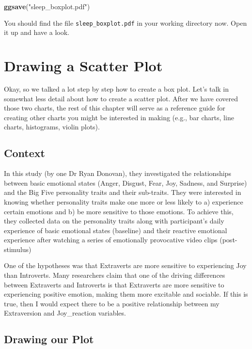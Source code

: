 \documentclass[
]{book}
\newenvironment{Shaded}{\begin{snugshade}}{\end{snugshade}}
\newcommand{\FunctionTok}[1]{\textcolor[rgb]{0.13,0.29,0.53}{\textbf{#1}}}
\newcommand{\NormalTok}[1]{#1}
\newcommand{\StringTok}[1]{\textcolor[rgb]{0.31,0.60,0.02}{#1}}
\begin{document}
\begin{Shaded}
\begin{Highlighting}[]
\FunctionTok{ggsave}\NormalTok{(}\StringTok{"sleep\_boxplot.pdf"}\NormalTok{)}
\end{Highlighting}
\end{Shaded}

You should find the file \texttt{sleep\_boxplot.pdf} in your working directory now. Open it up and have a look.

\section{Drawing a Scatter Plot}\label{drawing-a-scatter-plot}

Okay, so we talked a lot step by step how to create a box plot. Let's talk in somewhat less detail about how to create a scatter plot. After we have covered those two charts, the rest of this chapter will serve as a reference guide for creating other charts you might be interested in making (e.g., bar charts, line charts, histograms, violin plots).

\subsection{Context}\label{context}

In this study (by one Dr Ryan Donovan), they investigated the relationships between basic emotional states (Anger, Disgust, Fear, Joy, Sadness, and Surprise) and the Big Five personality traits and their sub-traits. They were interested in knowing whether personality traits make one more or less likely to a) experience certain emotions and b) be more sensitive to those emotions. To achieve this, they collected data on the personality traits along with participant's daily experience of basic emotional states (baseline) and their reactive emotional experience after watching a series of emotionally provocative video clips (post-stimulus)

One of the hypotheses was that Extraverts are more sensitive to experiencing Joy than Introverts. Many researchers claim that one of the driving differences between Extraverts and Introverts is that Extraverts are more sensitive to experiencing positive emotion, making them more excitable and sociable. If this is true, then I would expect there to be a positive relationship between my Extraversion and Joy\_reaction variables.

\subsection{Drawing our Plot}\label{drawing-our-plot}
\end{document}
